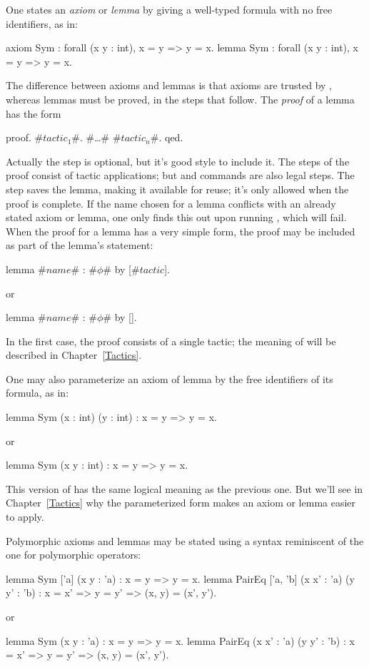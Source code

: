 One states an \emph{axiom} or \emph{lemma} by giving a well-typed formula with
no free identifiers, as in:
\begin{easycrypt}{}{}
axiom Sym : forall (x y : int), x = y => y = x.
lemma Sym : forall (x y : int), x = y => y = x.
\end{easycrypt}
The difference between axioms and lemmas is that axioms are trusted
by \EasyCrypt, whereas lemmas must be proved, in the steps that
follow. The \emph{proof} of a lemma has the form
\begin{easycrypt}{}{}
proof.
#$\mathit{tactic}_1$#. #\ldots# #$\mathit{tactic}_n$#.
qed.
\end{easycrypt}
Actually the  step is optional, but it's good style to include
it. The steps of the proof consist of tactic applications; but
 and  commands are also legal steps.
The  step saves the lemma, making it available for reuse;
it's only allowed when the proof is complete.
If the name chosen for a lemma conflicts with an already stated
axiom or lemma, one only finds this out upon running , which
will fail.
When the proof for a lemma has a very simple form, the proof may be
included as part of the lemma's statement:
\begin{easycrypt}{}{}
lemma #$\mathit{name}$# : #$\phi$# by [#$\mathit{tactic}$].
\end{easycrypt}
or
\begin{easycrypt}{}{}
lemma #$\mathit{name}$# : #$\phi$# by [].
\end{easycrypt}
In the first case, the proof consists of a single tactic; the meaning of
 will be described in Chapter~\ref{Tactics}.

One may also parameterize an axiom of lemma by the free identifiers of
its formula, as in:
\begin{easycrypt}{}{}
lemma Sym (x : int) (y : int) : x = y => y = x.
\end{easycrypt}
or
\begin{easycrypt}{}{}
lemma Sym (x y : int) : x = y => y = x.
\end{easycrypt}
This version of  has the same logical meaning as the previous
one. But we'll see in Chapter~\ref{Tactics} why the
parameterized form makes an axiom or lemma easier to apply.

Polymorphic axioms and lemmas may be stated using a syntax reminiscent
of the one for polymorphic operators:
\begin{easycrypt}{}{}
lemma Sym ['a] (x y : 'a) : x = y => y = x.
lemma PairEq ['a, 'b] (x x' : 'a) (y y' : 'b) :
  x = x' => y = y' => (x, y) = (x', y').
\end{easycrypt}
or
\begin{easycrypt}{}{}
lemma Sym (x y : 'a) : x = y => y = x.
lemma PairEq (x x' : 'a) (y y' : 'b) :
  x = x' => y = y' => (x, y) = (x', y').
\end{easycrypt}

